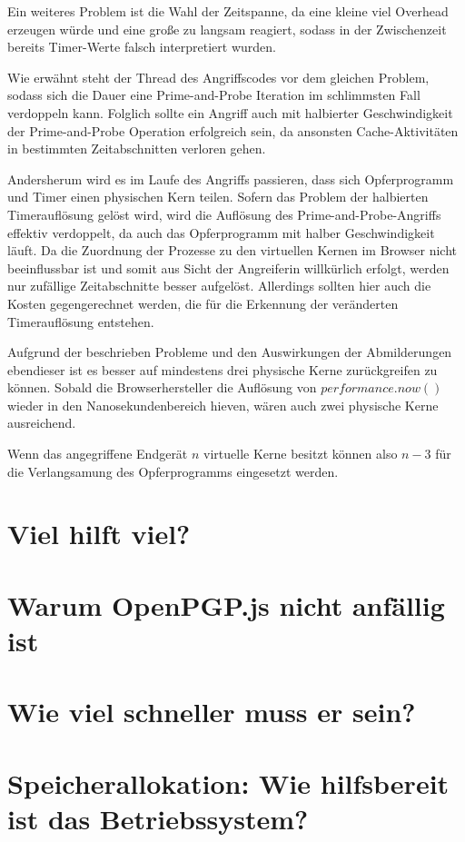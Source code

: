 Ein weiteres Problem ist die Wahl der Zeitspanne, da eine kleine viel Overhead erzeugen würde und eine große zu langsam reagiert, sodass in der Zwischenzeit bereits Timer-Werte falsch interpretiert wurden.

Wie erwähnt steht der Thread des Angriffscodes vor dem gleichen Problem, sodass sich die Dauer eine Prime-and-Probe Iteration im schlimmsten Fall verdoppeln kann.
Folglich sollte ein Angriff auch mit halbierter Geschwindigkeit der Prime-and-Probe Operation erfolgreich sein, da ansonsten Cache-Aktivitäten in bestimmten Zeitabschnitten verloren gehen.

Andersherum wird es im Laufe des Angriffs passieren, dass sich Opferprogramm und Timer einen physischen Kern teilen.
Sofern das Problem der halbierten Timerauflösung gelöst wird, wird die Auflösung des Prime-and-Probe-Angriffs effektiv verdoppelt, da auch das Opferprogramm mit halber Geschwindigkeit läuft.
Da die Zuordnung der Prozesse zu den virtuellen Kernen im Browser nicht beeinflussbar ist und somit aus Sicht der Angreiferin willkürlich erfolgt, werden nur zufällige Zeitabschnitte besser aufgelöst.
Allerdings sollten hier auch die Kosten gegengerechnet werden, die für die Erkennung der veränderten Timerauflösung entstehen.

Aufgrund der beschrieben Probleme und den Auswirkungen der Abmilderungen ebendieser ist es besser auf mindestens drei physische Kerne zurückgreifen zu können.
Sobald die Browserhersteller die Auflösung von $performance.now()$ wieder in den Nanosekundenbereich hieven, wären auch zwei physische Kerne ausreichend. 

Wenn das angegriffene Endgerät $n$ virtuelle Kerne besitzt können also $n-3$ für die Verlangsamung des Opferprogramms eingesetzt werden.

\section{Viel hilft viel?}

\section{Warum OpenPGP.js nicht anfällig ist}

\section{Wie viel schneller muss er sein?}

\section{Speicherallokation: Wie hilfsbereit ist das Betriebssystem?}

